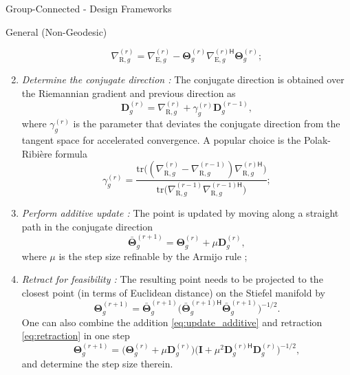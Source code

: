 \documentclass[journal]{IEEEtran}
\begin{document}
\begin{section}{Group-Connected - Design Frameworks}
\begin{subsection}{General (Non-Geodesic) }
\begin{enumerate}
\begin{equation}
				\nabla_{\mathrm{R},g}^{(r)} = \nabla_{\mathrm{E},g}^{(r)} - \mathbf{\Theta}_g^{(r)} {\nabla_{\mathrm{E},g}^{(r)\mathsf{H}}} \mathbf{\Theta}_g^{(r)};
				\label{eq:gradient_riemannian}
			\end{equation}
			\item \emph{Determine the conjugate direction \cite{Nocedal2006}:} The conjugate direction is obtained over the Riemannian gradient and previous direction as
			\begin{equation}
				\mathbf{D}_g^{(r)} = \nabla_{\mathrm{R},g}^{(r)} + \gamma_g^{(r)} \mathbf{D}_g^{(r-1)}, %
				\label{eq:direction_cg}
			\end{equation}
			where $\gamma_g^{(r)}$ is the parameter that deviates the conjugate direction from the tangent space for accelerated convergence. A popular choice is the Polak-Ribi\`{e}re formula
			\begin{equation}
				\gamma_g^{(r)} = \frac{\mathrm{tr}\bigl((\nabla_{\mathrm{R},g}^{(r)} - \nabla_{\mathrm{R},g}^{(r-1)}) {\nabla_{\mathrm{R},g}^{(r)\mathsf{H}}}\bigr)}{\mathrm{tr}\bigl(\nabla_{\mathrm{R},g}^{(r-1)} {\nabla_{\mathrm{R},g}^{(r-1)\mathsf{H}}}\bigr)}; %
				\label{eq:parameter_cg}
			\end{equation}
			\item \emph{Perform additive update \cite{Pan2022d}:} The point is updated by moving along a straight path in the conjugate direction
			\begin{equation}
				\bar{\mathbf{\Theta}}_g^{(r+1)} = \mathbf{\Theta}_g^{(r)} + \mu \mathbf{D}_g^{(r)},
				\label{eq:update_additive}
			\end{equation}
			where $\mu$ is the step size refinable by the Armijo rule \cite{Armijo1966};
			\item \emph{Retract for feasibility \cite{Absil2009,Li2023b}:} The resulting point needs to be projected to the closest point (in terms of Euclidean distance) on the Stiefel manifold by
			\begin{equation}
				\mathbf{\Theta}_g^{(r+1)} = \bar{\mathbf{\Theta}}_g^{(r+1)} \bigl({\bar{\mathbf{\Theta}}_g^{(r+1)\mathsf{H}}} \bar{\mathbf{\Theta}}_g^{(r+1)}\bigr)^{-1/2}.
				\label{eq:retraction}
			\end{equation}
			One can also combine the addition \eqref{eq:update_additive} and retraction \eqref{eq:retraction} in one step
			\begin{equation}
				\mathbf{\Theta}_g^{(r+1)} = \bigl(\mathbf{\Theta}_g^{(r)} + \mu \mathbf{D}_g^{(r)}\bigr) \bigl( \mathbf{I} + \mu^2 {\mathbf{D}_g^{(r)\mathsf{H}}} \mathbf{D}_g^{(r)} \bigr)^{-1/2},
				\label{eq:add_then_retract}
			\end{equation}
			and determine the step size therein.
		\end{enumerate}


\end{subsection}
\end{section}
\end{document}

